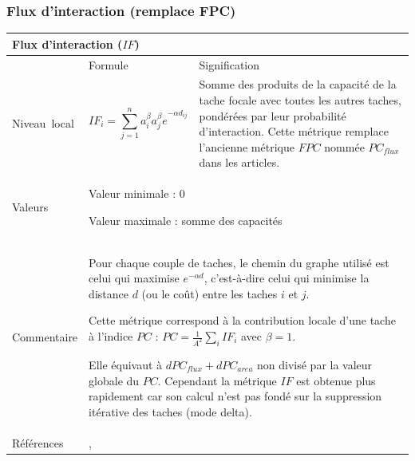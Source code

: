\documentclass{article}
\begin{document}
\subsubsection{Flux d'interaction (remplace FPC)}
\label{metric_IF}
\begin{table}[H]
\begin{tabular}{|m{3.24cm}|m{4.4810004cm}m{7.924cm}|}

\hline
\multicolumn{3}{|m{16.044998cm}|}{Flux d'interaction ($IF$)}\\\hline
 &
\multicolumn{1}{m{4.4810004cm}|}{Formule} &
Signification\\\hline
Niveau~local &
\multicolumn{1}{m{4.4810004cm}|}{\begin{equation*}
{\mathit{IF}}_{i}=\sum _{j=1}^{n}{{{a}_{i}^{\beta }{a}_{j}^{\beta }e}^{-\alpha {d}_{\mathit{ij}}}}
\end{equation*}
} &
Somme des produits de la capacité de la tache focale avec toutes les autres taches, pondérées par leur probabilité d’interaction. Cette métrique remplace l'ancienne métrique $FPC$ nommée $PC_{flux}$ dans les articles.

\\\hline
Valeurs &
\multicolumn{2}{m{12.6050005cm}|}{Valeur minimale : 0

Valeur maximale : somme des capacités
}\\\hline
Commentaire &
\multicolumn{2}{m{12.6050005cm}|}{Pour chaque couple de taches, le chemin du graphe utilisé est celui qui maximise  ${e}^{-\mathit{\alpha d}}$, c’est-à-dire celui qui minimise la distance $d$ (ou le coût) entre les taches $i$ et $j$.

Cette métrique correspond à la contribution locale d’une tache à l’indice $PC$ : $\mathit{PC}=\frac{1}{A^2}\sum _{i}{{\mathit{IF}}_{i}}$ avec $\beta = 1$. 

Elle équivaut à  ${dPC}_{flux}+{dPC}_{area}$ non divisé par la valeur globale du $PC$. Cependant la métrique $IF$ est obtenue plus rapidement car son calcul n’est pas fondé sur la suppression itérative des taches (mode delta).

}\\\hline
Références &
\multicolumn{2}{m{12.6050005cm}|}{\cite{2014_LUP},\cite{2017_landmod}}\\\hline
\end{tabular}
\end{table}
\end{document}
